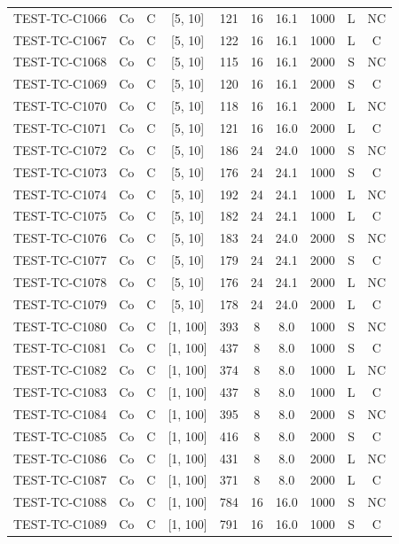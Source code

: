 \begin{longtable}{lccccccccc}
TEST-TC-C1066 & Co & C & [5, 10] & 121 & 16 & 16.1 & 1000 & L & NC \\
TEST-TC-C1067 & Co & C & [5, 10] & 122 & 16 & 16.1 & 1000 & L & C \\
TEST-TC-C1068 & Co & C & [5, 10] & 115 & 16 & 16.1 & 2000 & S & NC \\
TEST-TC-C1069 & Co & C & [5, 10] & 120 & 16 & 16.1 & 2000 & S & C \\
TEST-TC-C1070 & Co & C & [5, 10] & 118 & 16 & 16.1 & 2000 & L & NC \\
TEST-TC-C1071 & Co & C & [5, 10] & 121 & 16 & 16.0 & 2000 & L & C \\
TEST-TC-C1072 & Co & C & [5, 10] & 186 & 24 & 24.0 & 1000 & S & NC \\
TEST-TC-C1073 & Co & C & [5, 10] & 176 & 24 & 24.1 & 1000 & S & C \\
TEST-TC-C1074 & Co & C & [5, 10] & 192 & 24 & 24.1 & 1000 & L & NC \\
TEST-TC-C1075 & Co & C & [5, 10] & 182 & 24 & 24.1 & 1000 & L & C \\
TEST-TC-C1076 & Co & C & [5, 10] & 183 & 24 & 24.0 & 2000 & S & NC \\
TEST-TC-C1077 & Co & C & [5, 10] & 179 & 24 & 24.1 & 2000 & S & C \\
TEST-TC-C1078 & Co & C & [5, 10] & 176 & 24 & 24.1 & 2000 & L & NC \\
TEST-TC-C1079 & Co & C & [5, 10] & 178 & 24 & 24.0 & 2000 & L & C \\
TEST-TC-C1080 & Co & C & [1, 100] & 393 & 8 & 8.0 & 1000 & S & NC \\
TEST-TC-C1081 & Co & C & [1, 100] & 437 & 8 & 8.0 & 1000 & S & C \\
TEST-TC-C1082 & Co & C & [1, 100] & 374 & 8 & 8.0 & 1000 & L & NC \\
TEST-TC-C1083 & Co & C & [1, 100] & 437 & 8 & 8.0 & 1000 & L & C \\
TEST-TC-C1084 & Co & C & [1, 100] & 395 & 8 & 8.0 & 2000 & S & NC \\
TEST-TC-C1085 & Co & C & [1, 100] & 416 & 8 & 8.0 & 2000 & S & C \\
TEST-TC-C1086 & Co & C & [1, 100] & 431 & 8 & 8.0 & 2000 & L & NC \\
TEST-TC-C1087 & Co & C & [1, 100] & 371 & 8 & 8.0 & 2000 & L & C \\
TEST-TC-C1088 & Co & C & [1, 100] & 784 & 16 & 16.0 & 1000 & S & NC \\
TEST-TC-C1089 & Co & C & [1, 100] & 791 & 16 & 16.0 & 1000 & S & C \\

\end{longtable}
